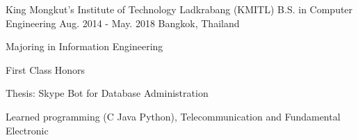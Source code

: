 

\begin{cventries}

    \cventry
    {King Mongkut's Institute of Technology Ladkrabang (KMITL)} %
    {B.S. in Computer Engineering} %
    {Aug. 2014 - May. 2018} %
    {Bangkok, Thailand} %
    {
    \begin{cvitems} %
        \item {Majoring in Information Engineering}
        \item {First Class Honors}
        \item {Thesis: Skype Bot for Database Administration}
        \item {Learned programming (C Java Python), Telecommunication and Fundamental Electronic}
    \end{cvitems}
    }

\end{cventries}
